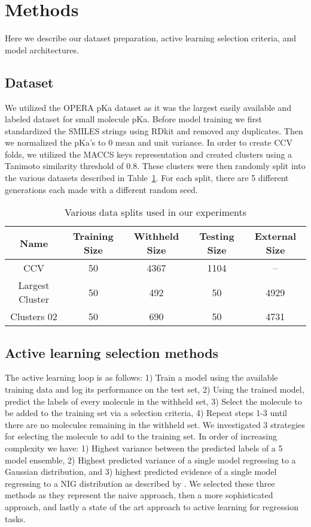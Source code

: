 \documentclass[journal=jmcmar,manuscript=article]{achemso}
\begin{document}
\section{Methods}
Here we describe our dataset preparation, active learning selection criteria, and model architectures.

\subsection{Dataset}
We utilized the OPERA pKa dataset\cite{operapKa} as it was the largest easily available and labeled dataset for small molecule pKa. Before model training we first standardized the SMILES\cite{smiles} strings using RDkit\cite{rdkit} and removed any duplicates. Then we normalized the pKa's to 0 mean and unit variance. In order to create CCV folds, we utilized the MACCS keys \cite{maccskeys} representation and created clusters using a Tanimoto similarity threshold of 0.8. These clusters were then randomly split into the various datasets described in Table~\ref{tab:datasets}. For each split, there are 5 different generations each made with a different random seed. 

\begin{table}[]
    \centering
    \begin{tabular}{c|c|c|c|c}
    \hline
        Name & Training Size & Withheld Size & Testing Size & External Size \\
    \hline
        CCV & 50 & 4367 & 1104 & -- \\
        Largest Cluster & 50 & 492 & 50 & 4929 \\
        Clusters 02 & 50 & 690 & 50 & 4731 \\
    \hline
    \end{tabular}
    \caption{Various data splits used in our experiments}
    \label{tab:datasets}
\end{table}


\subsection{Active learning selection methods}
The active learning loop is as follows: 1) Train a model using the available training data and log its performance on the test set, 2) Using the trained model, predict the labels of every molecule in the withheld set, 3) Select the molecule to be added to the training set via a selection criteria, 4) Repeat steps 1-3 until there are no molecules remaining in the withheld set. We investigated 3 strategies for selecting the molecule to add to the training set. In order of increasing complexity we have: 1) Highest variance between the predicted labels of a 5 model ensemble, 2) Highest predicted variance of a single model regressing to a Gaussian distribution, and 3) highest predicted evidence of a single model regressing to a NIG distribution as described by \citet{alnigregress}. We selected these three methods as they represent the naive approach, then a more sophisticated approach, and lastly a state of the art approach to active learning for regression tasks.
\end{document}
